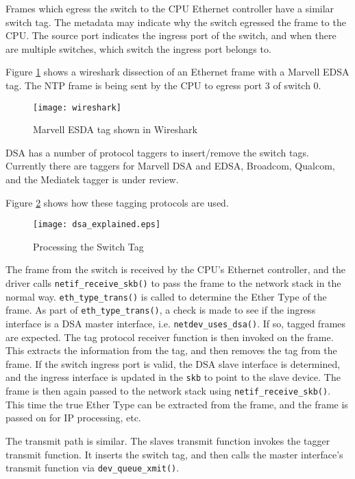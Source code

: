 \documentclass[letterpaper]{article}
\begin{document}
Frames which egress the switch to the CPU Ethernet controller have a
similar switch tag. The metadata may indicate why the switch egressed
the frame to the CPU. The source port indicates the ingress port of
the switch, and when there are multiple switches, which switch the
ingress port belongs to.

Figure \ref{wireshark} shows a wireshark dissection of an Ethernet
frame with a Marvell EDSA tag. The NTP frame is being sent by the CPU
to egress port 3 of switch 0.

\begin{figure}[ht]
  \centering
  \texttt{[image: wireshark]}
  \caption{Marvell ESDA tag shown in Wireshark}
  \label{wireshark}
\end{figure}

DSA has a number of protocol taggers to insert/remove the switch
tags. Currently there are taggers for Marvell DSA and EDSA, Broadcom,
Qualcom, and the Mediatek tagger is under review.

Figure \ref{stackflow} shows how these tagging protocols are used.

\begin{figure}[ht]
  \centering
  \texttt{[image: dsa\_explained.eps]}
  \caption{Processing the Switch Tag}
  \label{stackflow}
\end{figure}

The frame from the switch is received by the CPU's Ethernet controller,
and the driver calls \verb|netif_receive_skb()| to pass the frame to
the network stack in the normal way. \verb|eth_type_trans()| is called
to determine the Ether Type of the frame. As part of
\verb|eth_type_trans()|, a check is made to see if the ingress
interface is a DSA master interface, i.e. \verb|netdev_uses_dsa()|. If
so, tagged frames are expected. The tag protocol receiver function is
then invoked on the frame. This extracts the information from the tag,
and then removes the tag from the frame. If the switch ingress port is
valid, the DSA slave interface is determined, and the ingress
interface is updated in the \verb|skb| to point to the slave
device. The frame is then again passed to the network stack using
\verb|netif_receive_skb()|. This time the true Ether Type can be
extracted from the frame, and the frame is passed on for IP
processing, etc.

The transmit path is similar. The slaves transmit function invokes the
tagger transmit function. It inserts the switch tag, and then calls
the master interface's transmit function via \verb|dev_queue_xmit()|.
\end{document}

